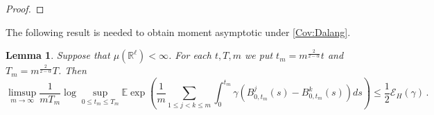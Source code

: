\documentclass[12pt,reqno]{amsart}
\newtheorem{lemma}[theorem]{Lemma}
\theoremstyle{remark}
\newcommand{\1}{\mathbf{1}}
\def\RR{\mathbb{R}}
\def\EE{\mathbb{E}}
\def\PP{\mathbb{P}}
\def\Z{\mathcal{Z}}
\begin{document}
\begin{proof}
	\end{proof}
	The following result is needed to obtain moment asymptotic under \ref{Cov:Dalang}.
	\begin{lemma}\label{lem:limtaum} Suppose that $\mu(\RR^\ell)<\infty$. For each $t,T,m$ we put $t_m = m^{\frac{2}{2-\alpha}}t$ and $T_m = m^{\frac{2}{2-\alpha}}T$. Then
		\begin{equation}\label{eqn:mmtau}
	\limsup_{m \to \infty} \frac{1}{mT_m} \log \sup_{0 \leq t_m \leq T_m} \EE \exp \left( \frac{1}{m} \sum_{1 \leq j < k \leq m} \int_0^{t_m} \gamma\left( B_{0, t_m}^j(s)-B_{0, t_m}^k(s) \right) ds \right) \leq \frac{1}{2} \mathcal{E}_H(\gamma)\,.		
		\end{equation} 
	\end{lemma}
\end{document}
